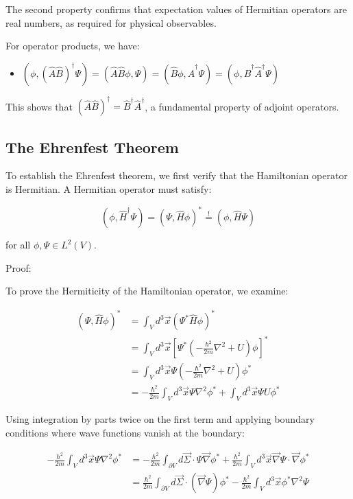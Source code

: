 \documentclass[italian]{HKNdocument}
\begin{document}
The second property confirms that expectation values of Hermitian operators are real numbers, as required for physical observables.

For operator products, we have:
\begin{itemize}
  \item $(\phi, (\hat{A}\hat{B})^\dagger\Psi) = (\hat{A}\hat{B}\phi, \Psi) = (\hat{B}\phi, \hat{A}^\dagger\Psi) = (\phi, \hat{B}^\dagger\hat{A}^\dagger\Psi)$
\end{itemize}

This shows that $(\hat{A}\hat{B})^\dagger = \hat{B}^\dagger\hat{A}^\dagger$, a fundamental property of adjoint operators.

\subsection{The Ehrenfest Theorem}

To establish the Ehrenfest theorem, we first verify that the Hamiltonian operator is Hermitian. A Hermitian operator must satisfy:

\begin{equation}
(\phi, \hat{H}^\dagger\Psi) = (\Psi, \hat{H}\phi)^* \stackrel{!}{=} (\phi, \hat{H}\Psi) \label{eq:1.82}
\end{equation}

for all $\phi, \Psi \in L^2(V)$.

Proof:


To prove the Hermiticity of the Hamiltonian operator, we examine:

\begin{align}
(\Psi, \hat{H}\phi)^* &= \int_V d^3\vec{x}(\Psi^*\hat{H}\phi)^* \\
&= \int_V d^3\vec{x}\left[\Psi^*\left(-\frac{\hbar^2}{2m}\nabla^2 + U\right)\phi\right]^* \\
&= \int_V d^3\vec{x}\Psi\left(-\frac{\hbar^2}{2m}\nabla^2 + U\right)\phi^* \label{eq:1.83} \\
&= -\frac{\hbar^2}{2m}\int_V d^3\vec{x}\Psi\nabla^2\phi^* + \int_V d^3\vec{x}\Psi U\phi^*
\end{align}

Using integration by parts twice on the first term and applying boundary conditions where wave functions vanish at the boundary:

\begin{align}
-\frac{\hbar^2}{2m}\int_V d^3\vec{x}\Psi\nabla^2\phi^* &= -\frac{\hbar^2}{2m}\int_{\partial V}d\vec{\Sigma}\cdot\Psi\vec{\nabla}\phi^* + \frac{\hbar^2}{2m}\int_V d^3\vec{x}\vec{\nabla}\Psi\cdot\vec{\nabla}\phi^* \label{eq:1.84} \\
&= \frac{\hbar^2}{2m}\int_{\partial V}d\vec{\Sigma}\cdot(\vec{\nabla}\Psi)\phi^* - \frac{\hbar^2}{2m}\int_V d^3\vec{x}\phi^*\nabla^2\Psi
\end{align}
\end{document}
